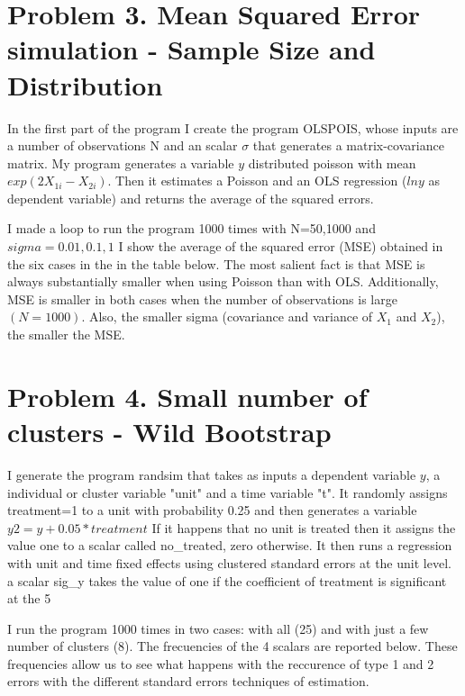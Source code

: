 \documentclass[12pt]{article}
\begin{document}
\section{Problem 3. Mean Squared Error simulation - Sample Size and Distribution}


In the first part of the program I create the program OLSPOIS, whose inputs are a number of observations N and an scalar $\sigma$ that generates a matrix-covariance matrix. My program generates a variable $y$ distributed poisson with mean $exp(2X_{1i}-X_{2i})$. Then it estimates a Poisson and an OLS regression ($lny$ as dependent variable) and returns the average of the squared errors. 


I made a loop to run the program 1000 times with N=50,1000 and $sigma=0.01,0.1,1$ I show the average of the squared error (MSE) obtained in the six cases in the in the table below. The most salient fact is that MSE is always substantially smaller when using Poisson than with OLS. Additionally, MSE is smaller in both cases when the number of observations is large $(N=1000)$. Also, the smaller sigma (covariance and variance of $X_1$ and $X_2$), the smaller the MSE. 



\pagebreak
\section{Problem 4. Small number of clusters - Wild Bootstrap}
I generate the program randsim that takes as inputs a dependent variable $y$, a individual or cluster variable "unit" and a time variable "t". It randomly assigns treatment=1 to a unit with probability 0.25 and then generates a variable $y2=y+0.05*treatment$ If it happens that no unit is treated then it assigns the value one to a scalar called no_treated, zero otherwise. It then runs a regression with unit and time fixed effects using clustered standard errors at the unit level. a scalar sig_y takes the value of one if the coefficient of treatment is significant at the 5%

I run the program 1000 times in two cases: with all (25) and with just a few number of clusters (8). The frecuencies of the 4 scalars are reported below. These frequencies allow us to see what happens with the reccurence of type 1 and 2 errors with the different standard errors techniques of estimation. 
\end{document}
